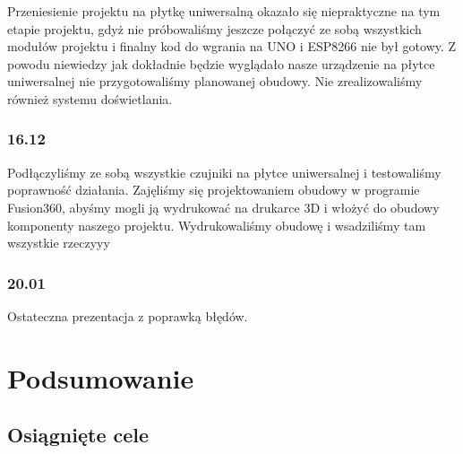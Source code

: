 \documentclass[12pt]{article}
\begin{document}
Przeniesienie projektu na płytkę uniwersalną okazało się niepraktyczne na tym etapie projektu, gdyż nie próbowaliśmy jeszcze połączyć ze sobą wszystkich modułów projektu i finalny kod do wgrania na UNO i ESP8266 nie był gotowy. Z powodu niewiedzy jak dokładnie będzie wyglądało nasze urządzenie na płytce uniwersalnej nie przygotowaliśmy planowanej obudowy. Nie zrealizowaliśmy również systemu doświetlania.

\subsubsection{16.12}
Podłączyliśmy ze sobą wszystkie czujniki na płytce uniwersalnej i testowaliśmy poprawność działania. Zajęliśmy się projektowaniem obudowy w programie Fusion360, abyśmy mogli ją wydrukować na drukarce 3D i włożyć do obudowy komponenty naszego projektu. Wydrukowaliśmy obudowę i wsadziliśmy tam wszystkie rzeczyyy

\subsubsection{20.01}
Ostateczna prezentacja z poprawką błędów.



\section{Podsumowanie }
\subsection{Osiągnięte cele}
\end{document}
